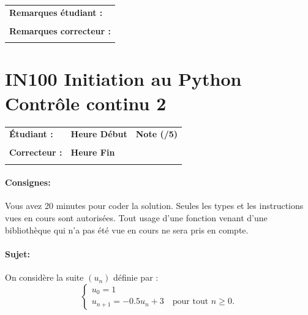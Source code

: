\documentclass[a4paper,11pt]{article}
\begin{document}
\vspace{0.5 cm}
\begin{table}[h!]
\centering
\renewcommand{\arraystretch}{1.4} %
\begin{tabular}{|p{15cm}|}
\hline
\textbf{Remarques étudiant :}    \\
 \\
\hline
\textbf{Remarques correcteur :}  \\
 \\
\hline
\end{tabular}
\end{table}

\newpage

\section*{\center IN100 Initiation au Python\\
Contrôle continu 2}

\vspace{0.3 cm}

\begin{table}[h!]
\centering
\renewcommand{\arraystretch}{1.4} %
\begin{tabular}{|p{10cm}|p{3cm}|p{2cm}|}
\hline
\textbf{Étudiant :} & \textbf{Heure Début }  & \textbf{Note (/5) }  \\
& & \\
\hline
\textbf{Correcteur :} & \textbf{Heure Fin } & \\
& & \\
\hline

\hline
\end{tabular}
\end{table}
\vspace{-0.4 cm}
\paragraph*{Consignes:} Vous avez 20 minutes pour coder la solution. Seules les types et les instructions vues en cours sont autorisées. Tout usage d'une fonction 
venant d'une bibliothèque qui n'a pas été vue en cours ne sera pris en compte. 



\paragraph*{Sujet:}


On considère la suite $(u_n)$ définie par :
\[
\begin{cases}
u_0 = 1 \\
u_{n+1} = -0.5u_n + 3 \quad \text{pour tout } n \geq 0. 
\end{cases}
\]
\end{document}
